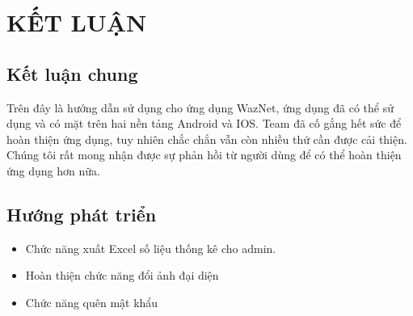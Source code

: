 
\section*{KẾT LUẬN}
\subsection*{Kết luận chung}

Trên đây là hướng dẫn sử dụng cho ứng dụng WazNet, ứng dụng đã có thể sử dụng và có mặt trên hai nền tảng Android và IOS. Team đã cố gắng hết sức để hoàn thiện ứng dụng, tuy nhiên chắc chắn vẫn còn nhiều thứ cần được cải thiện. Chúng tôi rất mong nhận được sự phản hồi từ người dùng để có thể hoàn thiện ứng dụng hơn nữa.
\subsection*{Hướng phát triển}

\begin{adjustwidth}{1.5em}{}
  \begin{itemize}
    \item Chức năng xuất Excel số liệu thống kê cho admin. 

    \item Hoàn thiện chức năng đổi ảnh đại diện

    \item Chức năng quên mật khẩu

  \end{itemize}
\end{adjustwidth}
\cleardoublepage